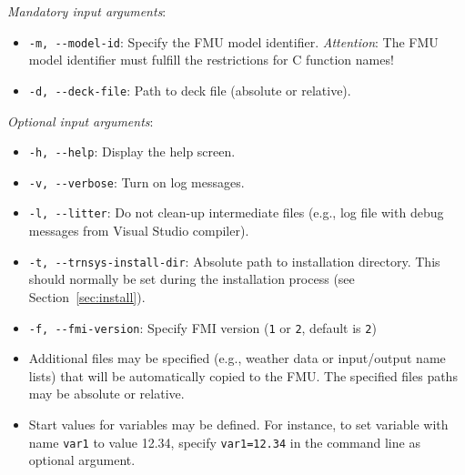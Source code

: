 \textit{Mandatory input arguments}:
\begin{itemize}

  \item \verb!-m, --model-id!: Specify the FMU model identifier. \emph{Attention}: The FMU model identifier must fulfill the restrictions for C function names!
  \item \verb!-d, --deck-file!: Path to \trnsys deck file (absolute or relative).

\end{itemize}
\textit{Optional input arguments}:
\begin{itemize}

  \item \verb!-h, --help!: Display the help screen.
  \item \verb!-v, --verbose!: Turn on log messages.
  \item \verb!-l, --litter!: Do not clean-up intermediate files (e.g., log file with debug messages from Visual Studio compiler).
  \item \verb!-t, --trnsys-install-dir!: Absolute path to \trnsys installation directory. This should normally be set during the installation process (see Section~\ref{sec:install}).
  \item \verb!-f, --fmi-version!: Specify FMI version (\verb!1! or \verb!2!, default is \verb!2!)
  \item Additional files may be specified (e.g., weather data or input/output name lists) that will be automatically copied to the FMU. The specified files paths may be absolute or relative.
  \item Start values for variables may be defined. For instance, to set variable with name \verb!var1! to value 12.34, specify \verb!var1=12.34! in the command line as optional argument.

\end{itemize}
